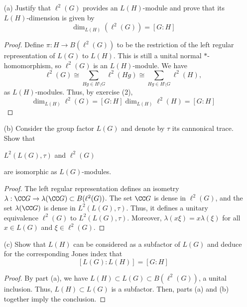 \documentclass{article}
\begin{document}
\begin{enumerate}
	\item[(a)] Justify that $ \ell^2(G)$ provides an $ L(H)$-module and prove that its $ L(H)$-dimension is given by 
	\[\dim_{L(H)}(\ell^2(G))=[G:H]\]

        \begin{proof}
          Define $\pi: H \to B(\ell^2(G))$ to be the restriction of the left regular representation of $L(G)$ to $L(H)$. This
          is still a unital normal $*$-homomorphism, so $\ell^2(G)$ is an $L(H)$-module. We have 
          $$\ell^2(G)  \cong \sum_{Hg \in H \setminus G} \ell^2(Hg) \cong \sum_{Hg \in H \setminus G} \ell^2(H),$$
          as $L(H)$-modules.
          Thus, by exercise (2),
          $$ \dim_{L(H)} \ell^2(G) = [G : H] \dim_{L(H)} \ell^2(H) = [G : H]$$
        \end{proof}
        
        
	
	\item[(b)] Consider the group factor $ L(G) $ and denote by $ \tau $ its cannonical trace. Show that 
	\begin{center}
		$ L^2(L(G),\tau) $ and $ \ell^2(G) $
	\end{center}
        are isomorphic as $ L(G)$-modules.

        \begin{proof}
          The left regular representation defines an isometry $\lambda: \CC G \to \lambda(\CC G) \subset B(\ell^2(G))$.
          The set $\CC G$ is dense in $\ell^2(G)$, and the set $\lambda(\CC G)$ is dense in $L^2(L(G), \tau)$.  Thus,
          it defines a unitary equivalence $\ell^2(G)$ to $L^2(L(G), \tau)$. Moreover, $\lambda(x \xi) = x \lambda(\xi)$
          for all $x \in L(G)$ and $\xi \in \ell^2(G)$.          
        \end{proof}

		

	\item[(c)] 
	Show that $ L(H) $ can be considered as a subfactor of $ L(G) $ and deduce for the corresponding Jones index that 
	\[[L(G):L(H)]=[G:H]\]

        \begin{proof}
          By part (a), we have $L(H) \subset L(G) \subset B(\ell^2(G))$, a unital inclusion.  Thus, $L(H) \subset L(G)$ is
          a subfactor.  Then, parts (a) and (b) together imply the conclusion.
        \end{proof}
			
\end{enumerate}
\end{document}
